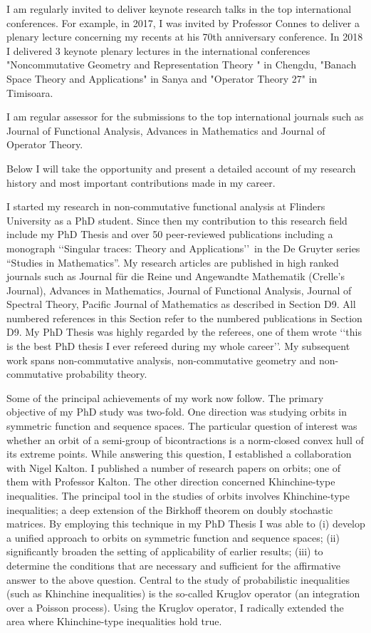 \documentclass[12pt]{article}
\begin{document}
I am regularly invited to deliver keynote research talks in the top international conferences. For example, in 2017, I was invited by Professor Connes to deliver a plenary lecture concerning my recents at his 70th anniversary conference. In 2018 I delivered 3 keynote plenary lectures in the international conferences "Noncommutative Geometry and Representation Theory " in Chengdu, "Banach Space Theory and Applications" in Sanya and "Operator Theory 27" in Timisoara.

I am regular assessor for the submissions to the top international journals such as Journal of Functional Analysis, Advances in Mathematics and Journal of Operator Theory.

Below I will take the opportunity and present a detailed account of my research history and most important contributions made in my career.

I started my research in non-commutative functional analysis at Flinders University as a PhD student. Since then my contribution to this research field include my PhD Thesis and over 50 peer-reviewed publications including a monograph \lq\lq Singular traces: Theory and Applications\rq\rq~in the De Gruyter series ``Studies in Mathematics''. My research articles are published in high ranked journals such as Journal f\"ur die Reine und Angewandte Mathematik (Crelle's Journal), Advances in Mathematics, Journal of Functional Analysis, Journal of Spectral Theory, Pacific Journal of Mathematics as described in Section D9. All numbered references in this Section refer to the numbered publications in Section D9. My PhD Thesis was highly regarded by the referees, one of them wrote \lq\lq this is the best PhD thesis I ever refereed during my whole career\rq\rq. My subsequent work spans non-commutative analysis, non-commutative geometry and non-commutative probability theory.

Some of the principal achievements of my work now follow.  The primary objective of my PhD study was two-fold. One direction was studying orbits in symmetric function and sequence spaces. The particular question of interest was whether an orbit of a semi-group of bicontractions is a norm-closed convex hull of its extreme points. While answering this question, I established a collaboration with Nigel Kalton. I published a number of research papers on orbits; one of them with Professor Kalton. The other direction concerned Khinchine-type inequalities. The principal tool in the studies of orbits involves Khinchine-type inequalities; a deep extension of the Birkhoff theorem on doubly stochastic matrices. By employing this technique in my PhD Thesis I was able to (i) develop a unified approach to orbits on symmetric function and sequence spaces; (ii) significantly broaden the setting of applicability of earlier results; (iii) to determine the conditions that are necessary and sufficient for the affirmative answer to the above question. Central to the study of probabilistic inequalities (such as Khinchine inequalities) is the so-called Kruglov operator (an integration over a Poisson process). Using the Kruglov operator, I radically extended the area where Khinchine-type inequalities hold true.
\end{document}
